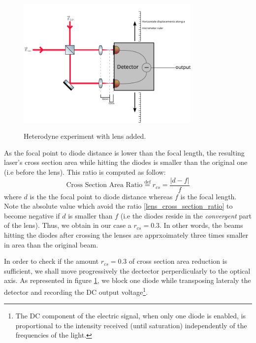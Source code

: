 \documentclass[11pt]{report}
\begin{document}
\begin{figure}[h!]
\caption{Heterodyne experiment with lens added.}
\centering
\includegraphics[width=0.8\textwidth]{heterodyne-lens}
\label{fig:heterodyne-lens}
\end{figure}

As the focal point to diode distance is lower than the focal length, the resulting laser's cross section area while hitting the diodes is smaller than the original one (i.e before the lens). This ratio is computed as follow:
\begin{equation}
\label{lens_cross_section_ratio}
\textrm{Cross Section Area Ratio} \stackrel{\text{def}}{=} r_{cs} = \frac{\vert d-f \vert}{f}
\end{equation}
where $d$ is the the focal point to diode distance whereas $f$ is the focal length. Note the absolute value which avoid the ratio \eqref{lens_cross_section_ratio} to become negative if $d$ is smaller than $f$ (i.e the diodes reside in the \textit{convergent} part of the lens). Thus, we obtain in our case a $r_{cs} = 0.3$. In other words, the beams hitting the diodes after crossing the lenses are apprxoimately three times smaller in area than the original beam.

In order to check if the amount $r_{cs} = 0.3$ of cross section area reduction is sufficient, we shall move progressively the dectector perperdicularly to the optical axis. As represented in figure \ref{fig:heterodyne-lens}, we block one diode while transposing lateraly the detector and recording the DC output voltage\footnote{The DC component of the electric signal, when only one diode is enabled, is proportional to the intensity received (until saturation) independently of the frequencies of the light. }.
\end{document}
